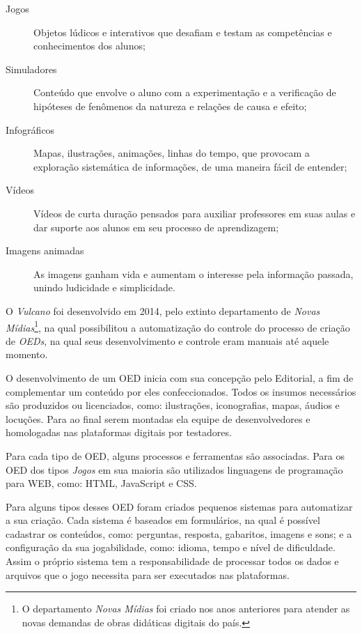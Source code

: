 \documentclass[
  12pt,            %
  openany,
  oneside,
  a4paper,         %
  english,      %
  brazil
]{article}
\numberwithin{figure}{section}
\numberwithin{table}{section}
\begin{document}
\vspace{-10mm}
\begin{singlespace}
  \begin{description}
    \item[Jogos] Objetos lúdicos e interativos que desafiam e testam as competências e conhecimentos dos alunos;
    \item[Simuladores] Conteúdo que envolve o aluno com a experimentação e a verificação de hipóteses de fenômenos da natureza e relações de causa e efeito;
    \item[Infográficos] Mapas, ilustrações, animações, linhas do tempo, que provocam a exploração sistemática de informações, de uma maneira fácil de entender;
    \item[Vídeos] Vídeos de curta duração pensados para auxiliar professores em suas aulas e dar suporte aos alunos em seu processo de aprendizagem;
    \item[Imagens animadas] As imagens ganham vida e aumentam o interesse pela informação passada, unindo ludicidade e simplicidade.
  \end{description}
\end{singlespace}
\vspace{-5mm}

O \textit{Vulcano} foi desenvolvido em 2014, pelo extinto departamento de \textit{Novas Mídias}\footnote{O departamento \textit{Novas Mídias} foi criado nos anos anteriores para atender as novas demandas de obras didáticas digitais do país.}, na qual possibilitou a automatização do controle do processo de criação de \textit{OEDs}, na qual seus desenvolvimento e controle eram manuais até aquele momento.

O desenvolvimento de um OED inicia com sua concepção pelo Editorial, a fim de complementar um conteúdo por eles confeccionados. Todos os insumos necessários são produzidos ou licenciados, como: ilustrações, iconografias, mapas, áudios e locuções. Para ao final serem montadas ela equipe de desenvolvedores e homologadas nas plataformas digitais por testadores.

Para cada tipo de OED, alguns processos e ferramentas são associadas. Para os OED dos tipos \textit{Jogos} em sua maioria são utilizados linguagens de programação para WEB, como: HTML, JavaScript e CSS.

Para alguns tipos desses OED foram criados pequenos sistemas para automatizar a sua criação. Cada sistema é baseados em formulários, na qual é possível cadastrar os conteúdos, como: perguntas, resposta, gabaritos, imagens e sons; e a configuração da sua jogabilidade, como: idioma, tempo e nível de dificuldade. Assim o próprio sistema tem a responsabilidade de processar todos os dados e arquivos que o jogo necessita para ser executados nas plataformas.
\end{document}
